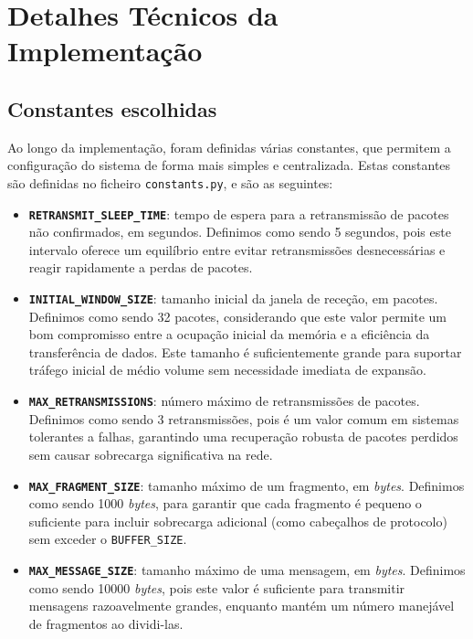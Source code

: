 \documentclass[a4paper,12pt]{scrreprt}
\begin{document}
\clearpage
{}

\section{Detalhes Técnicos da Implementação}

\subsection{Constantes escolhidas}

Ao longo da implementação, foram definidas várias constantes, que permitem a
configuração do sistema de forma mais simples e centralizada. Estas constantes
são definidas no ficheiro \texttt{constants.py}, e são as seguintes:
\begin{itemize}
    \item \textbf{\texttt{RETRANSMIT\_SLEEP\_TIME}}: tempo de espera para a retransmissão de pacotes não confirmados, em segundos.
    Definimos como sendo 5 segundos, pois este intervalo oferece um equilíbrio entre evitar retransmissões desnecessárias e reagir
    rapidamente a perdas de pacotes.
    \item \textbf{\texttt{INITIAL\_WINDOW\_SIZE}}: tamanho inicial da janela de receção, em pacotes. Definimos como sendo 32 pacotes,
    considerando que este valor permite um bom compromisso entre a ocupação inicial da memória e a eficiência da transferência de dados.
    Este tamanho é suficientemente grande para suportar tráfego inicial de médio volume sem necessidade imediata de expansão. 
    \item \textbf{\texttt{MAX\_RETRANSMISSIONS}}: número máximo de retransmissões de pacotes. Definimos como sendo 3 retransmissões,
    pois é um valor comum em sistemas tolerantes a falhas, garantindo uma recuperação robusta de pacotes perdidos sem causar sobrecarga
    significativa na rede.
    \item \textbf{\texttt{MAX\_FRAGMENT\_SIZE}}: tamanho máximo de um fragmento, em \textit{bytes}. Definimos como sendo 1000 \textit{bytes},
    para garantir que cada fragmento é pequeno o suficiente para incluir sobrecarga adicional (como cabeçalhos de protocolo) sem exceder o 
    \texttt{BUFFER\_SIZE}.
    \item \textbf{\texttt{MAX\_MESSAGE\_SIZE}}: tamanho máximo de uma mensagem, em \textit{bytes}. Definimos como sendo 10000 \textit{bytes},
    pois este valor é suficiente para transmitir mensagens razoavelmente grandes, enquanto mantém um número manejável de fragmentos ao dividi-las.

\end{itemize}
\end{document}
